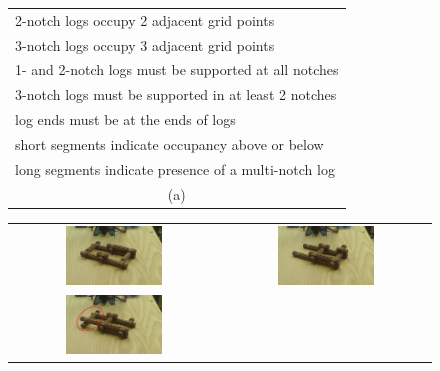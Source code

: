 \begin{figure}
  \centering
  \begin{tabular}{@{}l@{}}
    2-notch logs occupy 2 adjacent grid points\\
    3-notch logs occupy 3 adjacent grid points\\
    1- and 2-notch logs must be supported at all notches\\
    3-notch logs must be supported in at least 2 notches\\
    log ends must be at the ends of logs\\
    short segments indicate occupancy above or below\\
    long segments indicate presence of a multi-notch log\\[1ex]
    \multicolumn{1}{c}{(a)}
  \end{tabular}
  \par\vspace*{2ex}
  \begin{tabular}{@{}c@{\hspace{2pt}}c@{}}
    \includegraphics[width=0.48\textwidth]{images/valid-assemblies-1}&
    \includegraphics[width=0.48\textwidth]{images/valid-assemblies-2}\\[-0.5ex]
    \includegraphics[width=0.48\textwidth]{images/invalid-assemblies-1}&

\end{tabular}
\end{figure}
